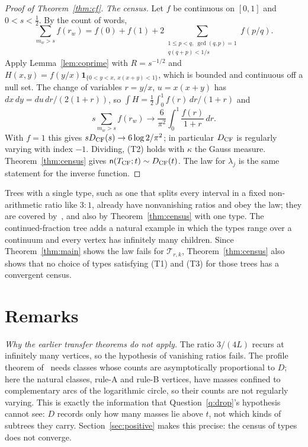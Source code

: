 \documentclass[11pt]{article}
\theoremstyle{definition}
\theoremstyle{remark}
\newcommand{\one}{\mathbf 1}
\newcommand{\cyl}{\mathcal T}
\newcommand{\ncount}{\mathsf n}
\begin{document}
\begin{proof}[Proof of Theorem~\ref{thm:cf}]
\emph{The census.} Let $f$ be continuous on $[0,1]$ and $0<s<\frac12$. By
the count of words,
\[
 \sum_{m_w>s}f(r_w)=f(0)+f(1)+2\!\!\sum_{\substack{1\le p<q,\ \gcd(q,p)=1\\
 q(q+p)<1/s}}\!\!f(p/q).
\]
Apply Lemma~\ref{lem:coprime} with $R=s^{-1/2}$ and
$H(x,y)=f(y/x)\one_{\{0<y<x,\ x(x+y)<1\}}$, which is bounded and
continuous off a null set. The change of variables $r=y/x$,
$u=x(x+y)$ has $dx\,dy=du\,dr/(2(1+r))$, so $\int H=\frac12\int_0^1f(r)\,dr/(1+r)$ and
\[
 s\sum_{m_w>s}f(r_w)\longrightarrow\frac6{\pi^2}\int_0^1\frac{f(r)}{1+r}\,dr .
\]
With $f=1$ this gives $sD_{\rm CF}(s)\to6\log2/\pi^2$; in particular $D_{\rm CF}$ is
regularly varying with index $-1$. Dividing, (T2) holds with $\kappa$ the
Gauss measure. Theorem~\ref{thm:census} gives
$\ncount(T_{\rm CF};t)\sim D_{\rm CF}(t)$. The law for $\lambda_j$ is the
same statement for the inverse function.
\end{proof}

Trees with a single type, such as one that splits every interval in a
fixed non-arithmetic ratio like $3:1$, already have nonvanishing ratios
and obey the law; they are covered by~\cite[Prop.~B.1]{K26}, and also by
Theorem~\ref{thm:census} with one type. The continued-fraction tree adds
a natural example in which the types range over a continuum and every
vertex has infinitely many children. Since Theorem~\ref{thm:main} shows
the law fails for $\cyl_{r,k}$, Theorem~\ref{thm:census} also shows that
no choice of types satisfying (T1) and (T3) for those trees has a
convergent census.

\section{Remarks}\label{sec:remarks}

\emph{Why the earlier transfer theorems do not apply.} The ratio $3/(4L)$
recurs at infinitely many vertices, so the hypothesis of vanishing ratios
fails. The profile theorem of~\cite{K26} needs classes whose counts are
asymptotically proportional to $D$; here the natural classes, rule-A and
rule-B vertices, have masses confined to complementary arcs of the
logarithmic circle, so their counts are not regularly varying. This is
exactly the information that Question~\ref{q:drop}'s hypothesis cannot
see: $D$ records only how many masses lie above $t$, not which kinds of
subtrees they carry. Section~\ref{sec:positive} makes this precise: the
census of types does not converge.
\end{document}
